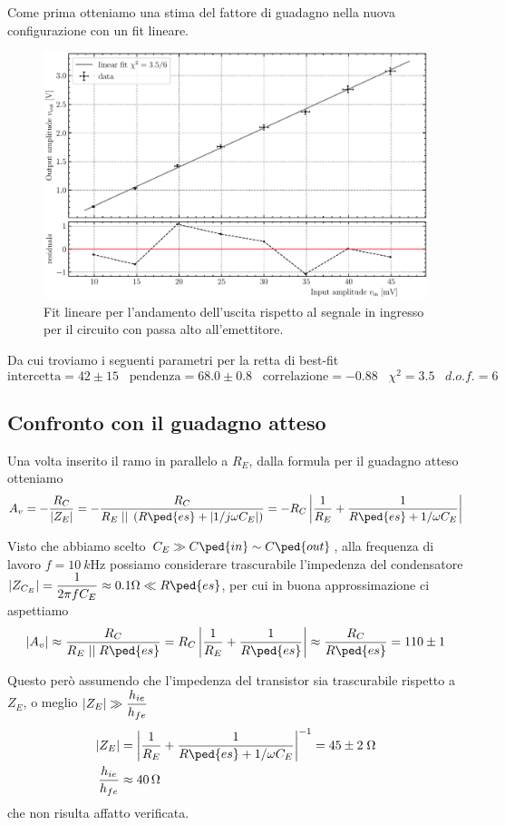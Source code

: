 \documentclass[10pt,a4paper]{article}
\begin{document}
Come prima otteniamo una stima del fattore di guadagno nella nuova
configurazione con un fit lineare.
\begin{figure}[htb]
\centering
\includegraphics[scale=0.6]{gainCE}
\caption{Fit lineare per l'andamento dell'uscita rispetto al segnale in
ingresso per il circuito con passa alto all'emettitore.
\label{fig: gainCEfit}}
\end{figure}

Da cui troviamo i seguenti parametri per la retta di best-fit
\[
\mathrm{intercetta} = 42 \pm 15 \;\;\;\mathrm{pendenza} = 68.0 \pm 0.8 \;\;\;\mathrm{correlazione} 
= -0.88 \;\;\; \chi^2 = 3.5 \;\;\; d.o.f. = 6
\]

\subsection{Confronto con il guadagno atteso}
Una volta inserito il ramo in parallelo a $R_E$, dalla formula per il guadagno
atteso otteniamo
\[
A_v = -\frac{R_C}{\abs{Z_E}} =
- \frac{R_C}{R_E \; \lvert \rvert \; \left(R\ped{es} + \abs{1/j\omega C_E}
\right)} =
- R_C \abs{\frac{1}{R_E} + \frac{1}{R\ped{es} + 1/\omega C_E}}
\]

Visto che abbiamo scelto $C_E \gg C\ped{in} \sim C\ped{out}$, alla frequenza
di lavoro $f = \SI{10}{k\Hz}$ possiamo considerare trascurabile l'impedenza
del condensatore $\abs{Z_{C_E}} = \dfrac{1}{2\pi f C_E} \approx 0.1 \si{\ohm}
\ll R\ped{es}$, per cui in buona approssimazione ci aspettiamo
\[
\abs{A_v} \approx
\frac{R_C}{R_E \; \lvert \rvert \; R\ped{es}} =
R_C \abs{\frac{1}{R_E} + \frac{1}{R\ped{es}}} \approx
\frac{R_C}{R\ped{es}} = 110 \pm 1
\]

Questo però assumendo che l'impedenza del transistor sia trascurabile rispetto
a $Z_E$, o meglio $\left| Z_E \right| \gg \dfrac{h_{ie}}{h_{fe}}$
\begin{align*}
\abs{Z_E} &= \abs{\frac{1}{R_E} + \frac{1}{R\ped{es} + 1/\omega C_E}}^{-1} =
45 \pm 2 \; \si{\ohm} \\
\frac{h_{ie}}{h_{fe}} &\approx \SI{40}{\ohm}
\end{align*}
che non risulta affatto verificata.
\end{document}

